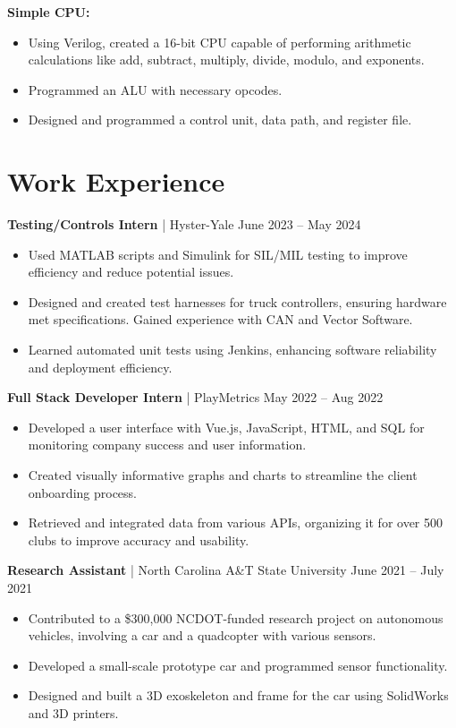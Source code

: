 \documentclass[letterpaper,9pt]{article}
\begin{document}
\noindent \textbf{Simple CPU:}
\begin{itemize}[leftmargin=*,itemsep=0pt,topsep=0pt]
    \item Using Verilog, created a 16-bit CPU capable of performing arithmetic calculations like add, subtract, multiply, divide, modulo, and exponents.
    \item Programmed an ALU with necessary opcodes.
    \item Designed and programmed a control unit, data path, and register file.
\end{itemize}

\section*{Work Experience}
\noindent \textbf{Testing/Controls Intern} | Hyster-Yale \hfill June 2023 – May 2024
\begin{itemize}[leftmargin=*,itemsep=0pt,topsep=0pt]
    \item Used MATLAB scripts and Simulink for SIL/MIL testing to improve efficiency and reduce potential issues.
    \item Designed and created test harnesses for truck controllers, ensuring hardware met specifications. Gained experience with CAN and Vector Software.
    \item Learned automated unit tests using Jenkins, enhancing software reliability and deployment efficiency.
\end{itemize}
\noindent \textbf{Full Stack Developer Intern} | PlayMetrics \hfill May 2022 – Aug 2022
\begin{itemize}[leftmargin=*,itemsep=0pt,topsep=0pt]
    \item Developed a user interface with Vue.js, JavaScript, HTML, and SQL for monitoring company success and user information.
    \item Created visually informative graphs and charts to streamline the client onboarding process.
    \item Retrieved and integrated data from various APIs, organizing it for over 500 clubs to improve accuracy and usability.
\end{itemize}
\noindent \textbf{Research Assistant} | North Carolina A\&T State University \hfill June 2021 – July 2021
\begin{itemize}[leftmargin=*,itemsep=0pt,topsep=0pt]
    \item Contributed to a \$300,000 NCDOT-funded research project on autonomous vehicles, involving a car and a quadcopter with various sensors.
    \item Developed a small-scale prototype car and programmed sensor functionality.
    \item Designed and built a 3D exoskeleton and frame for the car using SolidWorks and 3D printers.
\end{itemize}
\end{document}
